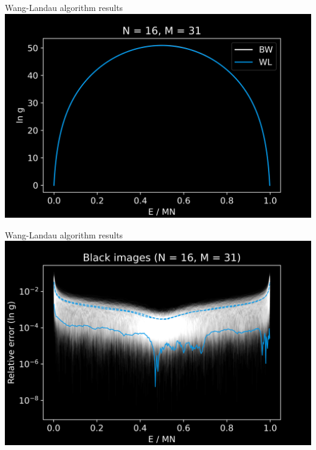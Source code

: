 \documentclass[14pt,c]{beamer}
\begin{document}
\begin{frame}{Wang-Landau algorithm results}
  \centering
  \includegraphics[width=0.9\framewidth]{wanglandau-bw}
\end{frame}


\begin{frame}{Wang-Landau algorithm results}
  \centering
  \includegraphics[width=0.9\framewidth]{wanglandau-bw-relerror}
\end{frame}

\end{document}

